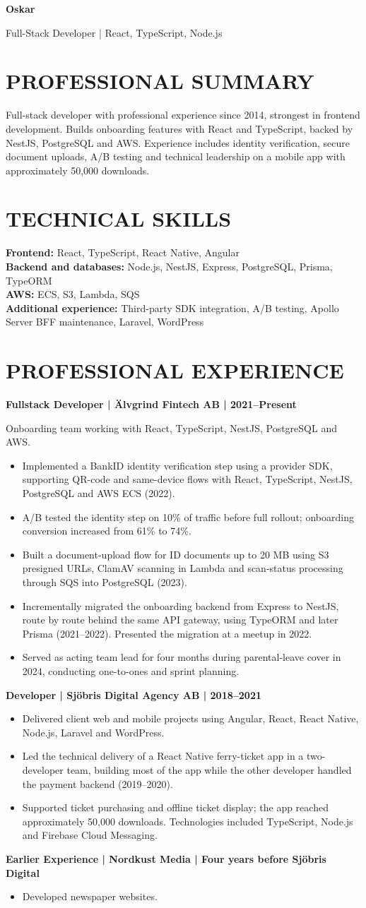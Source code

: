\documentclass[11pt,a4paper]{article}
\newcommand{\cvsection}[1]{\section*{#1}}
\begin{document}
{\Huge\bfseries\color{primarycolor} Oskar}\par
{\large\color{accentcolor} Full-Stack Developer | React, TypeScript, Node.js}

\cvsection{PROFESSIONAL SUMMARY}
Full-stack developer with professional experience since 2014, strongest in frontend development. Builds onboarding features with React and TypeScript, backed by NestJS, PostgreSQL and AWS. Experience includes identity verification, secure document uploads, A/B testing and technical leadership on a mobile app with approximately 50,000 downloads.

\cvsection{TECHNICAL SKILLS}
\textbf{Frontend:} React, TypeScript, React Native, Angular\\
\textbf{Backend and databases:} Node.js, NestJS, Express, PostgreSQL, Prisma, TypeORM\\
\textbf{AWS:} ECS, S3, Lambda, SQS\\
\textbf{Additional experience:} Third-party SDK integration, A/B testing, Apollo Server BFF maintenance, Laravel, WordPress

\cvsection{PROFESSIONAL EXPERIENCE}
\textbf{Fullstack Developer | Älvgrind Fintech AB | 2021–Present}\par
Onboarding team working with React, TypeScript, NestJS, PostgreSQL and AWS.
\begin{itemize}
\item Implemented a BankID identity verification step using a provider SDK, supporting QR-code and same-device flows with React, TypeScript, NestJS, PostgreSQL and AWS ECS (2022).
\item A/B tested the identity step on 10\% of traffic before full rollout; onboarding conversion increased from 61\% to 74\%.
\item Built a document-upload flow for ID documents up to 20 MB using S3 presigned URLs, ClamAV scanning in Lambda and scan-status processing through SQS into PostgreSQL (2023).
\item Incrementally migrated the onboarding backend from Express to NestJS, route by route behind the same API gateway, using TypeORM and later Prisma (2021–2022). Presented the migration at a meetup in 2022.
\item Served as acting team lead for four months during parental-leave cover in 2024, conducting one-to-ones and sprint planning.
\end{itemize}

\textbf{Developer | Sjöbris Digital Agency AB | 2018–2021}
\begin{itemize}
\item Delivered client web and mobile projects using Angular, React, React Native, Node.js, Laravel and WordPress.
\item Led the technical delivery of a React Native ferry-ticket app in a two-developer team, building most of the app while the other developer handled the payment backend (2019–2020).
\item Supported ticket purchasing and offline ticket display; the app reached approximately 50,000 downloads. Technologies included TypeScript, Node.js and Firebase Cloud Messaging.
\end{itemize}

\textbf{Earlier Experience | Nordkust Media | Four years before Sjöbris Digital}
\begin{itemize}
\item Developed newspaper websites.
\end{itemize}
\end{document}

